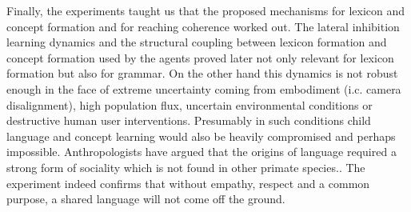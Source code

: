 Finally, the experiments taught us that the proposed mechanisms for lexicon and concept formation and for reaching 
coherence worked out. The lateral inhibition learning dynamics and the structural coupling 
between lexicon formation and concept formation used by the agents proved later not only relevant for 
lexicon formation but also for grammar. On the other hand this dynamics is not robust enough in the face 
of extreme uncertainty coming from embodiment (i.c. camera disalignment), high population flux, uncertain 
environmental conditions or destructive human user 
interventions. Presumably in such conditions child language and concept learning would also be heavily 
compromised and perhaps impossible. Anthropologists have argued that the origins of language required a strong  
form of sociality which is not found in other primate species.\cite{Knight:2014}. 
The experiment indeed confirms that without empathy, respect and a common purpose, a shared language will not come off the ground. 

